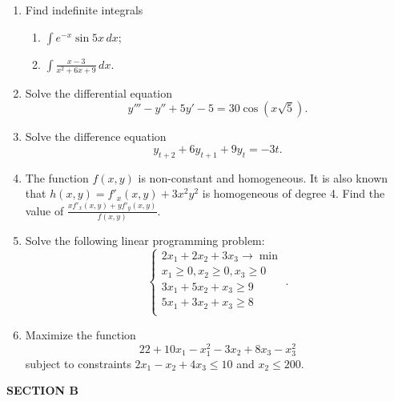 \documentclass[12pt,a4paper]{article}
\begin{document}
\begin{enumerate}

\item Find indefinite integrals
\begin{enumerate}
  \item  $\int {{e^{ - x}}\sin 5x \, dx}$;
  \item  $\int {\frac{{x - 3}}{{{x^2} + 6x + 9}} \, dx}$.
\end{enumerate}

\item Solve the differential equation
\[
y''' - y'' + 5y' - 5 = 30\cos (x\sqrt 5 ).
\]

\item Solve the difference equation
\[
{y_{t + 2}} + 6{y_{t + 1}} + 9{y_t} =  - 3t.
\]

\item The function $f(x, y)$ is non-constant and homogeneous. It is also known that $h(x, y) = f'_x(x, y) + 3x^2y^2$ is homogeneous of degree 4. Find the value of $\frac{xf'_x(x, y) + yf'_y(x, y)}{f(x, y)}$.

\item Solve the following linear programming problem:
\[
\begin{cases}
2x_1 + 2x_2 + 3x_3 \to \min \\
x_1 \geq 0, x_2 \geq 0, x_3 \geq 0 \\
3x_1 + 5x_2 + x_3 \geq 9 \\
5x_1 + 3x_2 + x_3 \geq 8 \\
\end{cases}.
\]

\item Maximize the function
\[
22 + 10x_1 - x_1^2 -3x_2 + 8x_3 - x_3^2
\]
subject to constraints $2x_1 -x_2+4x_3 \leq 10$ and $x_2 \leq 200$.

\end{enumerate}

\textbf{SECTION B}
\end{document}
